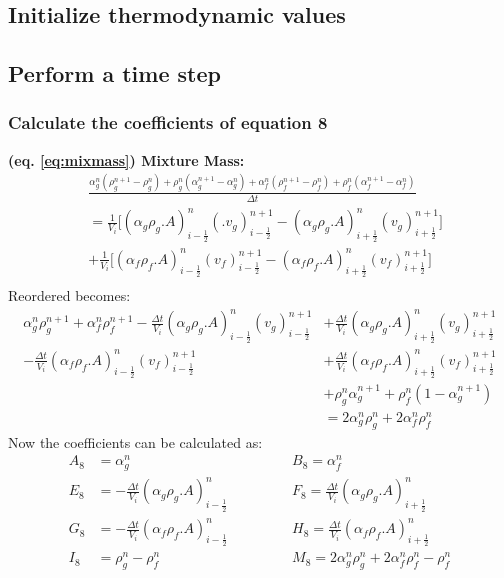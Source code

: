 \documentclass[11pt,letterpaper,titlepage]{article}
\newcommand{\half}{\frac{1}{2}}
\begin{document}
\subsection{Initialize thermodynamic values}

\subsection{Perform a time step}
\newpage
\subsubsection{Calculate the coefficients of equation 8}
\textbf{(eq. \ref{eq:mixmass}) Mixture Mass: }
\begin{equation*}
\begin{aligned}
&\frac{\alpha_g^n (\rho_g^{n+1}-\rho_g^n)+\rho_g^n(\alpha_g^{n+1}-\alpha_g^n)
+\alpha_f^n (\rho_f^{n+1}-\rho_f^n)+\rho_f^n(\alpha_f^{n+1}-\alpha_f^n)}{\Delta t}\\
&= \frac{1}{V_i}\biggr[(\alpha_g\rho_g.A)_{i-\half}^{n} (.v_g)_{i-\half}^{n+1}
-(\alpha_g\rho_g.A)_{i+\half}^{n} (v_g)_{i+\half}^{n+1} \biggr]\\
&+ \frac{1}{V_i}\biggr[(\alpha_f\rho_f.A)_{i-\half}^{n} (v_f)_{i-\half}^{n+1}
-(\alpha_f\rho_f.A)_{i+\half}^{n} (v_f)_{i+\half}^{n+1} \biggr]\\
\end{aligned}
\end{equation*}
\newline
Reordered becomes:
\begin{equation*}
\begin{aligned}
          \alpha_g^n \rho_g^{n+1}     +       \alpha_f^n \rho_f^{n+1}
 -        \frac{\Delta t}{V_i}(\alpha_g\rho_g.A)_{i-\half}^{n} (v_g)_{i-\half}^{n+1}
&+        \frac{\Delta t}{V_i}(\alpha_g\rho_g.A)_{i+\half}^{n} (v_g)_{i+\half}^{n+1} \\
 -        \frac{\Delta t}{V_i}(\alpha_f\rho_f.A)_{i-\half}^{n} (v_f)_{i-\half}^{n+1}
&+        \frac{\Delta t}{V_i}(\alpha_f\rho_f.A)_{i+\half}^{n} (v_f)_{i+\half}^{n+1} \\
&+        \rho_g^n\alpha_g^{n+1}      +       \rho_f^n(1-\alpha_g^{n+1})\\
&=        2\alpha_g^n\rho_g^n     +      2\alpha_f^n\rho_f^n     
\end{aligned}
\end{equation*}
\newline
Now the coefficients can be calculated as:
\begin{equation*}
\begin{aligned}
A_8 &=  \alpha_g^n       &&B_8 =  \alpha_f^n \\
E_8 &= -\frac{\Delta t}{V_i}(\alpha_g\rho_g.A)_{i-\half}^{n}   \quad \quad \quad
&&F_8 = \frac{\Delta t}{V_i}(\alpha_g\rho_g.A)_{i+\half}^{n} \\
G_8 &= -\frac{\Delta t}{V_i}(\alpha_f\rho_f.A)_{i-\half}^{n} 
&&H_8 = \frac{\Delta t}{V_i}(\alpha_f\rho_f.A)_{i+\half}^{n} \\
I_8 & = \rho_g^n - \rho_f^n
&&M_8 = 2\alpha_g^n\rho_g^n     +      2\alpha_f^n\rho_f^n - \rho_f^n
\end{aligned}
\end{equation*}
\end{document}
